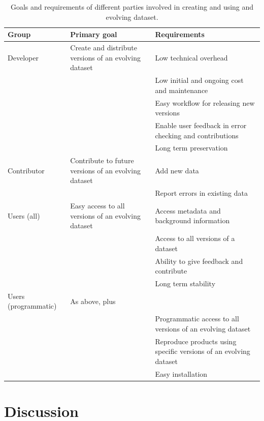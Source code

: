 \documentclass[a4paper,num-refs]{oup-contemporary}
\begin{document}
\begin{table}[t!]
\centering
\caption{Goals and requirements of different parties involved in creating and using and evolving dataset.}
\vspace{0.2cm}
  \begin{tabular}{p{3cm}p{5cm}p{8cm}}
  \hline
  \textbf{Group} & \textbf{Primary goal} & \textbf{Requirements} \\ \hline
  Developer & Create and distribute versions of an evolving dataset & Low technical overhead \\
    & & Low initial and ongoing cost and maintenance \\
    & & Easy workflow for releasing new versions \\
    & & Enable user feedback in error checking and contributions \\
    & & Long term preservation \\
  Contributor & Contribute to future versions of an evolving dataset & Add new data \\
    & & Report errors in existing data \\
  Users (all) & Easy access to all versions of an evolving dataset & Access metadata and background information\\
    & & Access to all versions of a dataset\\
    & & Ability to give feedback and contribute \\
    & & Long term stability \\
  Users (programmatic) &  As above, plus\\
    & & Programmatic access to all versions of an evolving dataset \\
    & & Reproduce products using specific versions of an evolving dataset \\
    & & Easy installation \\
  \hline
  \end{tabular}
\label{tab:user_requirements}
\end{table}

\section{Discussion}
\end{document}

